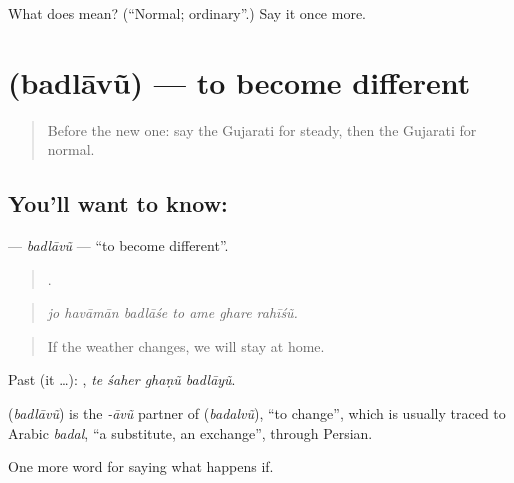 \begin{tcolorbox}[breakable,colback=teal!4,colframe=teal!35!black,title={Before you move on}]
What does  mean? (\textquotedblleft{}Normal; ordinary\textquotedblright{}.) Say it once more.
\end{tcolorbox}
\section[\texorpdfstring{\gu{બદલાવું} (badlāvũ)}{બદલાવું (badlāvũ)}]{ (badlāvũ) — to become different}

\label{lesson:GU-C377-badlavu}



\begin{quote}
Before the new one: say the Gujarati for steady, then the Gujarati for normal.
\end{quote}

\subsection*{You'll want to know: }
\textbf{} — \emph{badlāvũ} — \textquotedblleft{}to become different\textquotedblright{}.

\begin{quote}
      .
\end{quote}

\begin{quote}
\emph{jo havāmān badlāśe to ame ghare rahīśũ.}
\end{quote}

\begin{quote}
If the weather changes, we will stay at home.
\end{quote}

Past (it …):    , \emph{te śaher ghaṇũ badlāyũ}.

\begin{cousinweb}
\textbf{} (\emph{badlāvũ}) is the \emph{-āvũ} partner of \textbf{} (\emph{badalvũ}), \textquotedblleft{}to change\textquotedblright{}, which is usually traced to Arabic \emph{badal}, \textquotedblleft{}a substitute, an exchange\textquotedblright{}, through Persian.
\end{cousinweb}

\begin{grammarlens}[title={What you've built}]
One more word for saying what happens if.
\end{grammarlens}

